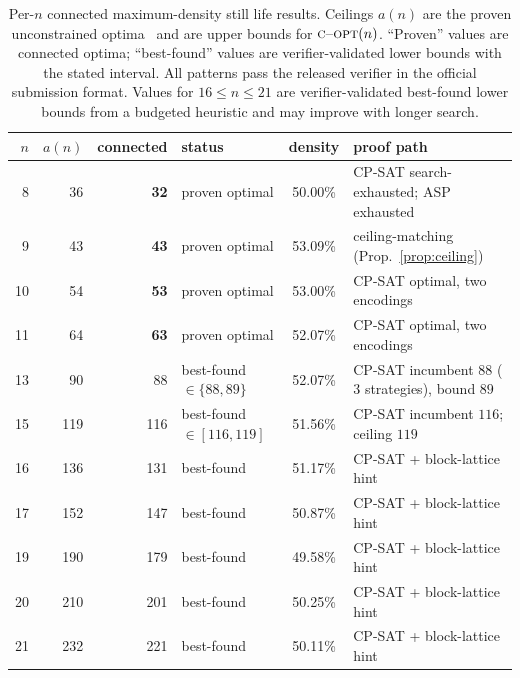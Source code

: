 \documentclass{article}
\newcommand{\copt}{\textsc{c\textendash opt}}
\begin{document}
\begin{table}[t]
  \caption{Per-$n$ connected maximum-density still life results. Ceilings $a(n)$ are the proven unconstrained optima~\citep{chu2012,oeis} and are upper bounds for $\copt(n)$. ``Proven'' values are connected optima; ``best-found'' values are verifier-validated lower bounds with the stated interval. All patterns pass the released verifier in the official submission format. Values for $16\le n\le 21$ are verifier-validated best-found lower bounds from a budgeted heuristic and may improve with longer search.}
  \label{tab:main}
  \centering
  \small
  \begin{tabular}{rrrlcl}
    \toprule
    $n$ & $a(n)$ & connected & status & density & proof path \\
    \midrule
     8 &  36 & \textbf{32} & proven optimal & 50.00\% & CP-SAT search-exhausted; ASP exhausted \\
     9 &  43 & \textbf{43} & proven optimal & 53.09\% & ceiling-matching (Prop.~\ref{prop:ceiling}) \\
    10 &  54 & \textbf{53} & proven optimal\footnotemark[1] & 53.00\% & CP-SAT optimal, two encodings \\
    11 &  64 & \textbf{63} & proven optimal\footnotemark[1] & 52.07\% & CP-SAT optimal, two encodings \\
    13 &  90 & 88 & best-found $\in\{88,89\}$ & 52.07\% & CP-SAT incumbent $88$ ($3$ strategies), bound $89$ \\
    15 & 119 & 116 & best-found $\in[116,119]$ & 51.56\% & CP-SAT incumbent $116$; ceiling $119$ \\
    16 & 136 & 131 & best-found & 51.17\% & CP-SAT + block-lattice hint \\
    17 & 152 & 147 & best-found & 50.87\% & CP-SAT + block-lattice hint \\
    19 & 190 & 179 & best-found & 49.58\% & CP-SAT + block-lattice hint \\
    20 & 210 & 201 & best-found & 50.25\% & CP-SAT + block-lattice hint \\
    21 & 232 & 221 & best-found & 50.11\% & CP-SAT + block-lattice hint \\
    \bottomrule
  \end{tabular}
\end{table}
\end{document}
